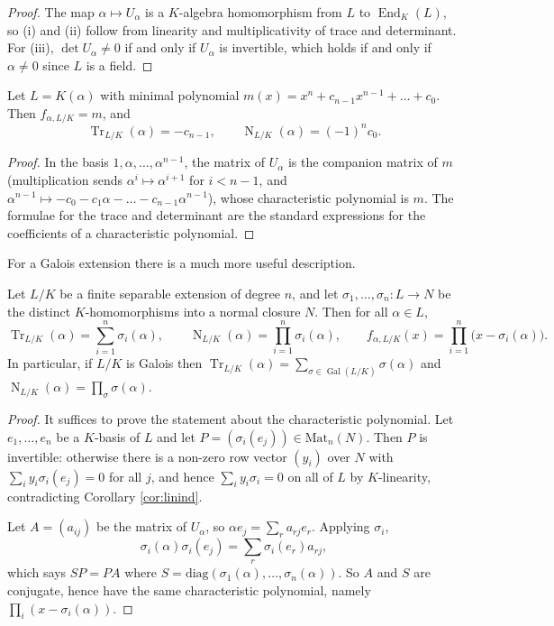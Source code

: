 \documentclass[a4paper]{scrartcl}
\newcommand{\Gal}{\operatorname{Gal}}
\newcommand{\Tr}{\operatorname{Tr}}
\newcommand{\Nm}{\operatorname{N}}
\begin{document}
\begin{proof}
	The map $\alpha \mapsto U_\alpha$ is a $K$-algebra homomorphism from $L$ to $\operatorname{End}_K(L)$, so (i) and (ii) follow from linearity and multiplicativity of trace and determinant. For (iii), $\det U_\alpha \neq 0$ if and only if $U_\alpha$ is invertible, which holds if and only if $\alpha \neq 0$ since $L$ is a field.
\end{proof}

\begin{proposition}\label{prop:charpolymin}
	Let $L = K(\alpha)$ with minimal polynomial $m(x) = x^n + c_{n-1}x^{n-1}+\dots+c_0$. Then $f_{\alpha,L/K} = m$, and
	$$\Tr_{L/K}(\alpha) = -c_{n-1}, \qquad \Nm_{L/K}(\alpha) = (-1)^nc_0.$$
\end{proposition}

\begin{proof}
	In the basis $1,\alpha,\dots,\alpha^{n-1}$, the matrix of $U_\alpha$ is the companion matrix of $m$ (multiplication sends $\alpha^i\mapsto\alpha^{i+1}$ for $i<n-1$, and $\alpha^{n-1}\mapsto -c_0-c_1\alpha-\dots-c_{n-1}\alpha^{n-1}$), whose characteristic polynomial is $m$. The formulae for the trace and determinant are the standard expressions for the coefficients of a characteristic polynomial.
\end{proof}

For a Galois extension there is a much more useful description.

\begin{proposition}\label{prop:tracegalois}
	Let $L/K$ be a finite separable extension of degree $n$, and let $\sigma_1,\dots,\sigma_n : L \to N$ be the distinct $K$-homomorphisms into a normal closure $N$. Then for all $\alpha \in L$,
	$$\Tr_{L/K}(\alpha) = \sum_{i=1}^n\sigma_i(\alpha), \qquad \Nm_{L/K}(\alpha) = \prod_{i=1}^n\sigma_i(\alpha), \qquad f_{\alpha,L/K}(x) = \prod_{i=1}^n\big(x - \sigma_i(\alpha)\big).$$
	In particular, if $L/K$ is Galois then $\Tr_{L/K}(\alpha) = \sum_{\sigma\in\Gal(L/K)}\sigma(\alpha)$ and $\Nm_{L/K}(\alpha)=\prod_{\sigma}\sigma(\alpha)$.
\end{proposition}

\begin{proof}
	It suffices to prove the statement about the characteristic polynomial. Let $e_1,\dots,e_n$ be a $K$-basis of $L$ and let $P = (\sigma_i(e_j)) \in \mathrm{Mat}_n(N)$. Then $P$ is invertible: otherwise there is a non-zero row vector $(y_i)$ over $N$ with $\sum_i y_i\sigma_i(e_j) = 0$ for all $j$, and hence $\sum_i y_i \sigma_i = 0$ on all of $L$ by $K$-linearity, contradicting Corollary \ref{cor:linind}.

	Let $A = (a_{ij})$ be the matrix of $U_\alpha$, so $\alpha e_j = \sum_r a_{rj}e_r$. Applying $\sigma_i$,
	$$\sigma_i(\alpha)\sigma_i(e_j) = \sum_r \sigma_i(e_r)a_{rj},$$
	which says $SP = PA$ where $S = \mathrm{diag}(\sigma_1(\alpha),\dots,\sigma_n(\alpha))$. So $A$ and $S$ are conjugate, hence have the same characteristic polynomial, namely $\prod_i(x-\sigma_i(\alpha))$.
\end{proof}
\end{document}
